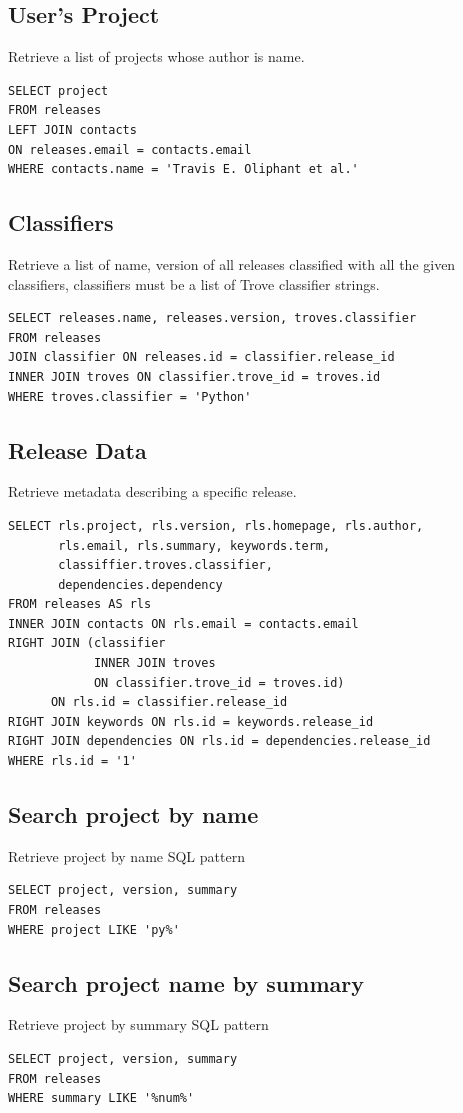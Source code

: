 \documentclass[a4paper,12pt]{article}
\begin{document}
\subsection{User's Project}
Retrieve a list of projects whose author is name.
\begin{verbatim}
SELECT project
FROM releases
LEFT JOIN contacts
ON releases.email = contacts.email
WHERE contacts.name = 'Travis E. Oliphant et al.'
\end{verbatim}

\subsection{Classifiers}
Retrieve a list of name, version of all releases classified with all the given classifiers, classifiers must be a list of Trove classifier strings.
\begin{verbatim}
SELECT releases.name, releases.version, troves.classifier
FROM releases
JOIN classifier ON releases.id = classifier.release_id
INNER JOIN troves ON classifier.trove_id = troves.id
WHERE troves.classifier = 'Python'
\end{verbatim}

\subsection{Release Data}
Retrieve metadata describing a specific release.
\begin{verbatim}
SELECT rls.project, rls.version, rls.homepage, rls.author,
       rls.email, rls.summary, keywords.term,
       classiffier.troves.classifier,
       dependencies.dependency
FROM releases AS rls
INNER JOIN contacts ON rls.email = contacts.email
RIGHT JOIN (classifier
            INNER JOIN troves
            ON classifier.trove_id = troves.id)
      ON rls.id = classifier.release_id
RIGHT JOIN keywords ON rls.id = keywords.release_id
RIGHT JOIN dependencies ON rls.id = dependencies.release_id
WHERE rls.id = '1'
\end{verbatim}

\subsection{Search project by name}
Retrieve project by name SQL pattern
\begin{verbatim}
SELECT project, version, summary
FROM releases
WHERE project LIKE 'py%'
\end{verbatim}

\subsection{Search project name by summary}
Retrieve project by summary SQL pattern
\begin{verbatim}
SELECT project, version, summary
FROM releases
WHERE summary LIKE '%num%'
\end{verbatim}
\end{document}
